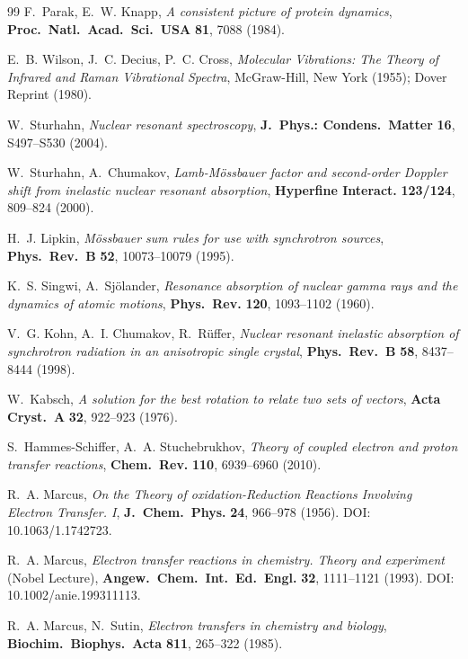 \documentclass[11pt,a4paper,twoside]{article}
\theoremstyle{remark}
\begin{document}
\begin{thebibliography}{99}
F.~Parak, E.~W. Knapp,
\emph{A consistent picture of protein dynamics},
\textbf{Proc.\ Natl.\ Acad.\ Sci.\ USA} \textbf{81}, 7088 (1984).

E.~B. Wilson, J.~C. Decius, P.~C. Cross,
\emph{Molecular Vibrations: The Theory of Infrared and Raman
Vibrational Spectra},
McGraw-Hill, New York (1955); Dover Reprint (1980).

W.~Sturhahn,
\emph{Nuclear resonant spectroscopy},
\textbf{J.\ Phys.: Condens.\ Matter} \textbf{16}, S497--S530 (2004).

W.~Sturhahn, A.~Chumakov,
\emph{Lamb-M\"ossbauer factor and second-order Doppler shift from
inelastic nuclear resonant absorption},
\textbf{Hyperfine Interact.} \textbf{123/124}, 809--824 (2000).

H.~J. Lipkin,
\emph{M\"ossbauer sum rules for use with synchrotron sources},
\textbf{Phys.\ Rev.\ B} \textbf{52}, 10073--10079 (1995).

K.~S. Singwi, A.~Sj\"olander,
\emph{Resonance absorption of nuclear gamma rays and the dynamics of
atomic motions},
\textbf{Phys.\ Rev.} \textbf{120}, 1093--1102 (1960).

V.~G. Kohn, A.~I. Chumakov, R.~R\"uffer,
\emph{Nuclear resonant inelastic absorption of synchrotron radiation
in an anisotropic single crystal},
\textbf{Phys.\ Rev.\ B} \textbf{58}, 8437--8444 (1998).

W.~Kabsch,
\emph{A solution for the best rotation to relate two sets of vectors},
\textbf{Acta Cryst.\ A} \textbf{32}, 922--923 (1976).

S.~Hammes-Schiffer, A.~A. Stuchebrukhov,
\emph{Theory of coupled electron and proton transfer reactions},
\textbf{Chem.\ Rev.} \textbf{110}, 6939--6960 (2010).

R.~A. Marcus,
\emph{On the Theory of oxidation-Reduction Reactions Involving
Electron Transfer. I},
\textbf{J.\ Chem.\ Phys.} \textbf{24}, 966--978 (1956).
DOI: 10.1063/1.1742723.

R.~A. Marcus,
\emph{Electron transfer reactions in chemistry. Theory and experiment}
(Nobel Lecture),
\textbf{Angew.\ Chem.\ Int.\ Ed.\ Engl.} \textbf{32}, 1111--1121 (1993).
DOI: 10.1002/anie.199311113.

R.~A. Marcus, N.~Sutin,
\emph{Electron transfers in chemistry and biology},
\textbf{Biochim.\ Biophys.\ Acta} \textbf{811}, 265--322 (1985).


\end{thebibliography}
\end{document}
